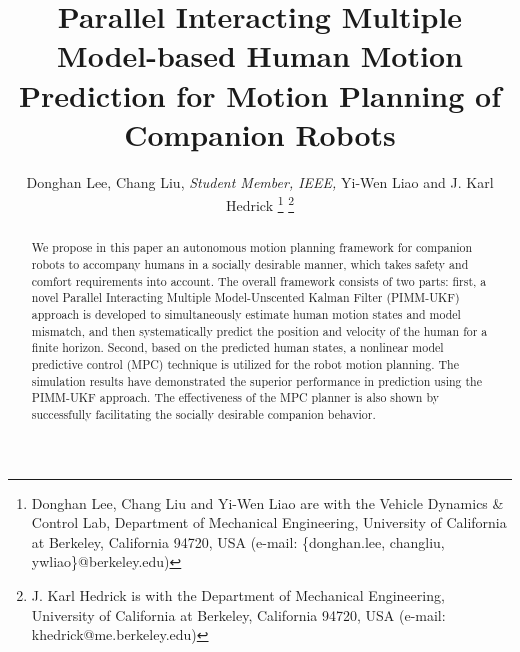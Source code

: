 \documentclass[journal]{IEEEtran}
\title{\LARGE \bf
Parallel Interacting Multiple Model-based Human Motion Prediction for Motion Planning of Companion Robots
}
\author{Donghan Lee, Chang Liu, \textit{Student Member, IEEE,} Yi-Wen Liao and J. Karl Hedrick%
	\thanks{Donghan Lee, Chang Liu and Yi-Wen Liao are with the Vehicle Dynamics \& Control Lab, Department of Mechanical Engineering, University of California at Berkeley, California 94720, USA (e-mail: \{donghan.lee, changliu, ywliao\}@berkeley.edu)}%
	\thanks{J. Karl Hedrick is with the Department of Mechanical Engineering, University of California at Berkeley, California 94720, USA (e-mail: khedrick@me.berkeley.edu)}%
}
\DeclareRobustCommand{\dhnote}[1]{\ifthenelse{\boolean{include-notes}}%
{\textcolor{blue}{\textbf{DH: #1}}}{}}
\begin{document}
	
	\maketitle
	\thispagestyle{empty}
	\pagestyle{empty}
	
\setlength{\belowcaptionskip}{-1pt} %
	\begin{abstract}
	We propose in this paper an autonomous motion planning framework for companion robots to accompany humans in a socially desirable manner, which takes safety and comfort requirements into account.
		The overall framework consists of two parts: first, a novel Parallel Interacting Multiple Model-Unscented Kalman Filter (PIMM-UKF) approach is developed to simultaneously estimate human motion states and model mismatch, and then systematically predict the position and velocity of the human for a finite horizon.
        Second, based on the predicted human states, a nonlinear model predictive control (MPC) technique is utilized for the robot motion planning.
		The simulation results have demonstrated the superior performance in prediction using the PIMM-UKF approach. The effectiveness of the MPC planner is also shown by successfully facilitating the socially desirable companion behavior.
	\end{abstract}
    
\end{document}
